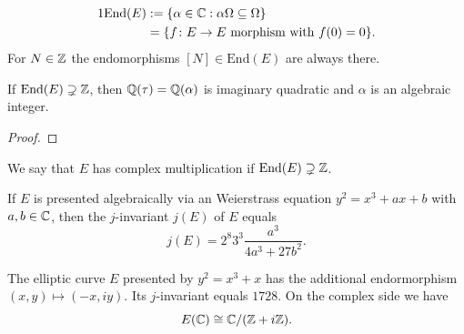\documentclass{beamer}
\begin{document}
\begin{frame}
  \begin{alignat*}1
    \mathrm{End}(E) &:= \{\alpha\in \IC : \alpha \Omega\subset
    \Omega\}\\
    &= \{f\colon E\rightarrow E \text{ morphism with
    }f(0)=0\}.    
  \end{alignat*}
  For $N\in{\mathbb{Z}}$ the endomorphisms $[N] \in \mathrm{End}(E)$ are
  always there.
  
  \begin{lemma}
    If $\mathrm{End}(E) \supsetneq {\mathbb{Z}}$, then
    ${\mathbb{Q}}(\tau)={\mathbb{Q}}(\alpha)$
    is imaginary
    quadratic and $\alpha$ is an algebraic integer. 
  \end{lemma}
  \begin{proof}
    \bigskip\bigskip\bigskip\bigskip\bigskip\bigskip\bigskip
  \end{proof}
\end{frame}

\begin{frame}
  \begin{definition}
    We say that $E$ has \alert{complex multiplication} if
    $\mathrm{End}(E)\supsetneq {\mathbb{Z}}$. 
  \end{definition}

  \begin{definition}
    If $E$ is presented algebraically via an Weierstrass equation $y^2 =
    x^3+ax+b$ with $a,b\in{\mathbb{C}}$, then the \alert{$j$-invariant} $j(E)$ of $E$ equals
    \begin{equation*}
      j(E) = 2^8 3^3 \frac{a^3}{4a^3+27b^2}. 
    \end{equation*}  
  \end{definition}

  \begin{example}
    The elliptic curve $E$ presented by $y^2=x^3+x$ has the additional
    endormorphism
    $(x,y)\mapsto (-x, i y)$. Its $j$-invariant equals $1728$. On the
    complex side we have $$E({\mathbb{C}})\cong {\mathbb{C}}/({\mathbb{Z}}+i
    {\mathbb{Z}}).$$
  \end{example}
\end{frame}
\end{document}
